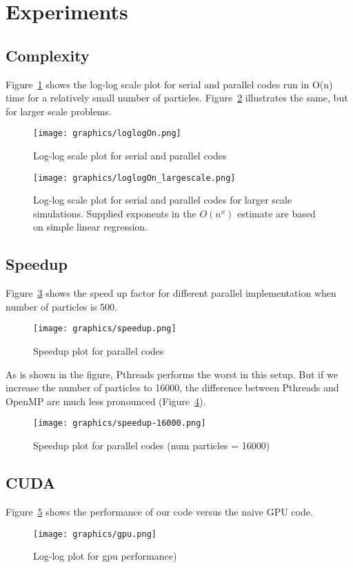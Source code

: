 \documentclass[11pt]{article}
\begin{document}
\section{Experiments}
\subsection{Complexity}
Figure~\ref{fig:loglogOn} shows the log-log scale plot for serial and parallel codes run in O(n) time for a relatively small number of particles. Figure~\ref{fig:loglogOn_largescale} illustrates the same, but for larger scale problems.

\begin{figure}[htb]
  \centering
  \texttt{[image: graphics/loglogOn.png]}
  \caption{Log-log scale plot for serial and parallel codes}
  \label{fig:loglogOn}
\end{figure}

\begin{figure}[htb]
  \centering
  \texttt{[image: graphics/loglogOn\_largescale.png]}
  \caption{Log-log scale plot for serial and parallel codes for larger scale simulations. Supplied exponents in the $O(n^x)$ estimate are based on simple linear regression.}
  \label{fig:loglogOn_largescale}
\end{figure}

\subsection{Speedup}
Figure~\ref{fig:speedup} shows the speed up factor for different parallel implementation when number of particles is 500.
\begin{figure}[htb]
  \centering
  \texttt{[image: graphics/speedup.png]}
  \caption{Speedup plot for parallel codes}
  \label{fig:speedup}
\end{figure}

As is shown in the figure, Pthreads performs the worst in this setup. But if we increase the number of particles to 16000, the difference between Pthreads and OpenMP are much less pronounced (Figure~\ref{fig:speedup-16000}). 
\begin{figure}[htb]
  \centering
  \texttt{[image: graphics/speedup-16000.png]}
  \caption{Speedup plot for parallel codes (num particles = 16000)}
  \label{fig:speedup-16000}
\end{figure}

\subsection{CUDA}
Figure~\ref{fig:gpu} shows the performance of our code versus the naive GPU code.
\begin{figure}[htb]
  \centering
  \texttt{[image: graphics/gpu.png]}
  \caption{Log-log plot for gpu performance)}
  \label{fig:gpu}
\end{figure}
\end{document}
